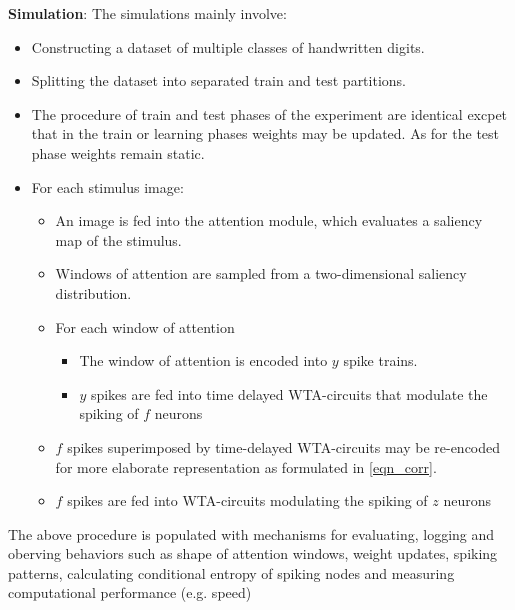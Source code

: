 \documentclass{report}
\begin{document}
\textbf{Simulation}: The simulations mainly involve:
\begin{itemize}
  \item Constructing a dataset of multiple classes of handwritten digits.
  \item Splitting the dataset into separated train and test partitions.
  \item The procedure of train and test phases of the experiment are identical excpet that in the train or learning phases weights may be updated. As for the test phase weights remain static.
  \item For each stimulus image:
  \begin{itemize}
  	\item An image is fed into the attention module, which evaluates a saliency map of the stimulus.
  	\item Windows of attention are sampled from a two-dimensional saliency distribution.
  	\item For each window of attention
  	\begin{itemize}
	  	\item The window of attention is encoded into $y$ spike trains.
	  	\item $y$ spikes are fed into time delayed WTA-circuits that modulate the spiking of $f$ neurons
		\end{itemize}
		\item $f$ spikes superimposed by time-delayed WTA-circuits may be re-encoded for more elaborate representation as formulated in \ref{eqn_corr}.
		\item $f$ spikes are fed into WTA-circuits modulating the spiking of $z$ neurons
	\end{itemize}
\end{itemize}
The above procedure is populated with mechanisms for evaluating, logging and oberving behaviors such as shape of attention windows, weight updates, spiking patterns, calculating conditional entropy of spiking nodes and measuring computational performance (e.g. speed)\\
\end{document}
